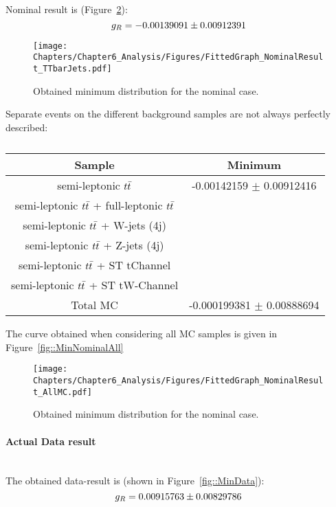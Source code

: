 Nominal result is (Figure~\ref{fig::MinNominal}):
\begin{equation}
 g_{R} = -0.00139091 \pm 0.00912391
\end{equation}

\begin{figure}[h!t]
 \centering
 \texttt{[image: Chapters/Chapter6\_Analysis/Figures/FittedGraph\_NominalResult\_TTbarJets.pdf]}
 \caption{Obtained minimum distribution for the nominal case.} \label{fig::MinNominal}
\end{figure}

Separate events on the different background samples are not always perfectly described:
\begin{table}[h!t]
 \centering
 \caption{} \label{table::BckInfl}
 \renewcommand{\arraystretch}{1.2}
 \begin{tabular}{c|c}
  Sample 						& Minimum 			\\
  \hline
  semi-leptonic $t\bar{t}$ 				& -0.00142159 $\pm$ 0.00912416 	\\
  semi-leptonic $t\bar{t}$ + full-leptonic $t\bar{t}$ 	&  	\\
  semi-leptonic $t\bar{t}$ + W-jets (4j) 			&  	\\
  semi-leptonic $t\bar{t}$ + Z-jets (4j) 			&  		\\
  semi-leptonic $t\bar{t}$ + ST tChannel 			&  	\\
  semi-leptonic $t\bar{t}$ + ST tW-Channel  		&  	\\
  \hline
  Total MC 			& -0.000199381 $\pm$ 0.00888694 
 \end{tabular}
\end{table}

The curve obtained when considering all MC samples is given in Figure~\ref{fig::MinNominalAll}
\begin{figure}[h!t]
 \centering
 \texttt{[image: Chapters/Chapter6\_Analysis/Figures/FittedGraph\_NominalResult\_AllMC.pdf]}
 \caption{Obtained minimum distribution for the nominal case.} \label{fig::MinNominal}
\end{figure}

\paragraph{Actual Data result} \hfill \\

The obtained data-result is (shown in Figure~\ref{fig::MinData}):
\begin{equation}
 g_{R} = 0.00915763 \pm 0.00829786
\end{equation}

